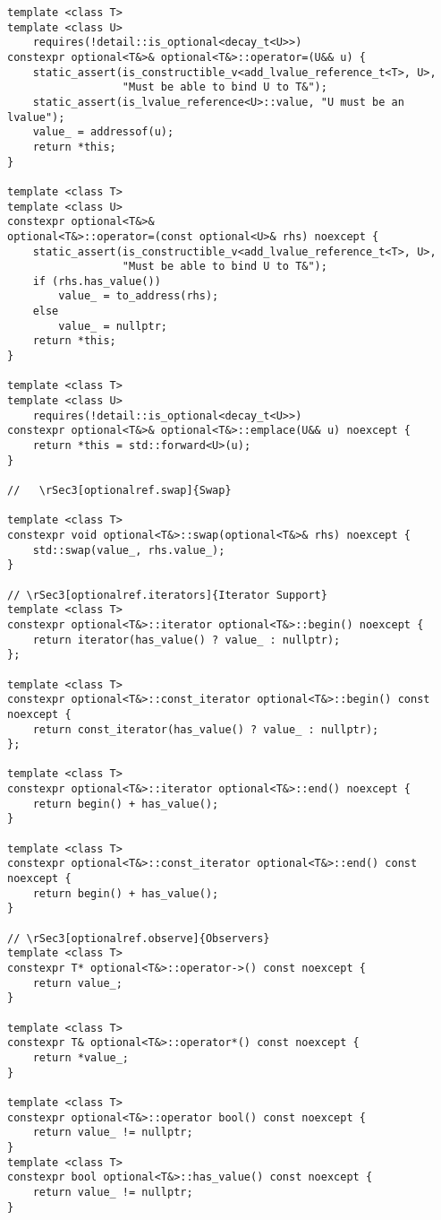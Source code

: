 \documentclass[a4paper,10pt,oneside,openany,final,article]{memoir}
\begin{document}
\begin{verbatim}
template <class T>
template <class U>
    requires(!detail::is_optional<decay_t<U>>)
constexpr optional<T&>& optional<T&>::operator=(U&& u) {
    static_assert(is_constructible_v<add_lvalue_reference_t<T>, U>,
                  "Must be able to bind U to T&");
    static_assert(is_lvalue_reference<U>::value, "U must be an lvalue");
    value_ = addressof(u);
    return *this;
}

template <class T>
template <class U>
constexpr optional<T&>&
optional<T&>::operator=(const optional<U>& rhs) noexcept {
    static_assert(is_constructible_v<add_lvalue_reference_t<T>, U>,
                  "Must be able to bind U to T&");
    if (rhs.has_value())
        value_ = to_address(rhs);
    else
        value_ = nullptr;
    return *this;
}

template <class T>
template <class U>
    requires(!detail::is_optional<decay_t<U>>)
constexpr optional<T&>& optional<T&>::emplace(U&& u) noexcept {
    return *this = std::forward<U>(u);
}

//   \rSec3[optionalref.swap]{Swap}

template <class T>
constexpr void optional<T&>::swap(optional<T&>& rhs) noexcept {
    std::swap(value_, rhs.value_);
}

// \rSec3[optionalref.iterators]{Iterator Support}
template <class T>
constexpr optional<T&>::iterator optional<T&>::begin() noexcept {
    return iterator(has_value() ? value_ : nullptr);
};

template <class T>
constexpr optional<T&>::const_iterator optional<T&>::begin() const noexcept {
    return const_iterator(has_value() ? value_ : nullptr);
};

template <class T>
constexpr optional<T&>::iterator optional<T&>::end() noexcept {
    return begin() + has_value();
}

template <class T>
constexpr optional<T&>::const_iterator optional<T&>::end() const noexcept {
    return begin() + has_value();
}

// \rSec3[optionalref.observe]{Observers}
template <class T>
constexpr T* optional<T&>::operator->() const noexcept {
    return value_;
}

template <class T>
constexpr T& optional<T&>::operator*() const noexcept {
    return *value_;
}

template <class T>
constexpr optional<T&>::operator bool() const noexcept {
    return value_ != nullptr;
}
template <class T>
constexpr bool optional<T&>::has_value() const noexcept {
    return value_ != nullptr;
}


\end{verbatim}
\end{document}
